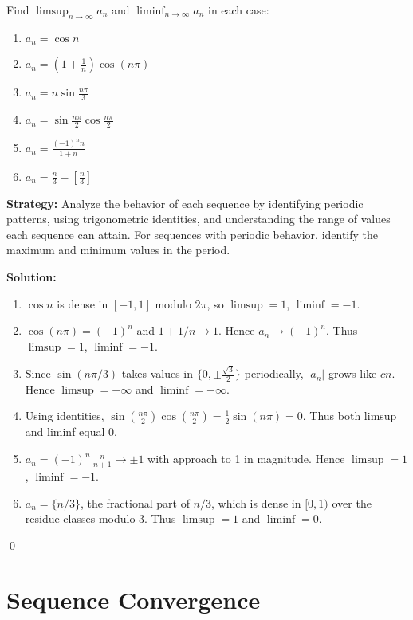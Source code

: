 \begin{problembox}
\begin{problemstatement}
Find \(\limsup_{n \to \infty} a_n\) and \(\liminf_{n \to \infty} a_n\) in each case:
\begin{enumerate}[label=\alph*)]
\item \(a_n=\cos n\)
\item \(a_n=\left(1 + \frac{1}{n}\right) \cos (n\pi)\)
\item \(a_n=n \sin \frac{n\pi}{3}\)
\item \(a_n=\sin \frac{n\pi}{2} \cos \frac{n\pi}{2}\)
\item \(a_n=\frac{(-1)^n n}{1 + n}\)
\item \(a_n=\frac{n}{3} - \left[\frac{n}{3}\right]\)
\end{enumerate}
\end{problemstatement}
\end{problembox}

\noindent\textbf{Strategy:} Analyze the behavior of each sequence by identifying periodic patterns, using trigonometric identities, and understanding the range of values each sequence can attain. For sequences with periodic behavior, identify the maximum and minimum values in the period.

\bigskip\noindent\textbf{Solution:}
\begin{enumerate}[label=(\alph*)]
\item \(\cos n\) is dense in \([-1,1]\) modulo \(2\pi\), so \(\limsup=1\), \(\liminf=-1\).
\item \(\cos(n\pi)=(-1)^n\) and \(1+1/n\to 1\). Hence \(a_n\to (-1)^n\). Thus \(\limsup=1\), \(\liminf=-1\).
\item Since \(\sin(n\pi/3)\) takes values in \(\{0,\pm\tfrac{\sqrt{3}}{2}\}\) periodically, \(|a_n|\) grows like \(cn\). Hence \(\limsup=+\infty\) and \(\liminf=-\infty\).
\item Using identities, \(\sin(\tfrac{n\pi}{2})\cos(\tfrac{n\pi}{2})=\tfrac{1}{2}\sin(n\pi)=0\). Thus both limsup and liminf equal 0.
\item \(a_n=(-1)^n\, \tfrac{n}{n+1}\to \pm 1\) with approach to 1 in magnitude. Hence \(\limsup=1\), \(\liminf=-1\).
\item \(a_n=\{n/3\}\), the fractional part of \(n/3\), which is dense in \([0,1)\) over the residue classes modulo 3. Thus \(\limsup=1\) and \(\liminf=0\).
\end{enumerate}\qed
\section{Sequence Convergence}

